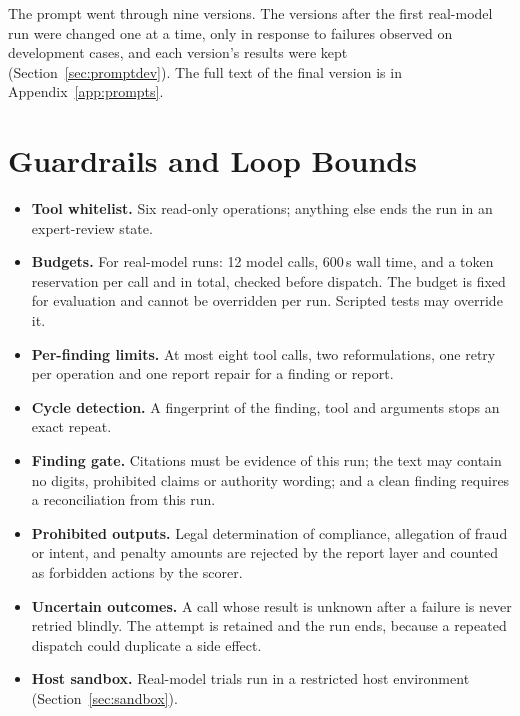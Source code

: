 The prompt went through nine versions. The versions after the first real-model run were changed one at a
time, only in response to failures observed on development cases, and each version's results were kept
(Section~\ref{sec:promptdev}). The full text of the final version is in Appendix~\ref{app:prompts}.

\section{Guardrails and Loop Bounds}
\begin{itemize}[itemsep=2pt]
\item \textbf{Tool whitelist.} Six read-only operations; anything else ends the run in an expert-review state.
\item \textbf{Budgets.} For real-model runs: 12 model calls, 600\,s wall time, and a token reservation per call
      and in total, checked before dispatch. The budget is fixed for evaluation and cannot be overridden per run.
      Scripted tests may override it.
\item \textbf{Per-finding limits.} At most eight tool calls, two reformulations, one retry per operation and one
      report repair for a finding or report.
\item \textbf{Cycle detection.} A fingerprint of the finding, tool and arguments stops an exact repeat.
\item \textbf{Finding gate.} Citations must be evidence of this run; the text may contain no digits, prohibited
      claims or authority wording; and a clean finding requires a reconciliation from this run.
\item \textbf{Prohibited outputs.} Legal determination of compliance, allegation of fraud or intent, and penalty
      amounts are rejected by the report layer and counted as forbidden actions by the scorer.
\item \textbf{Uncertain outcomes.} A call whose result is unknown after a failure is never retried blindly. The
      attempt is retained and the run ends, because a repeated dispatch could duplicate a side effect.
\item \textbf{Host sandbox.} Real-model trials run in a restricted host environment (Section~\ref{sec:sandbox}).
\end{itemize}

